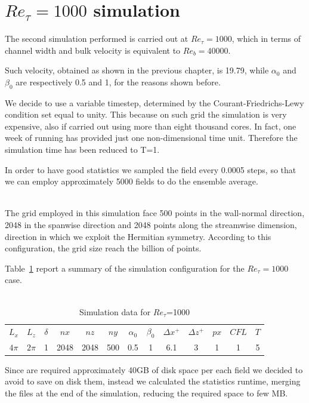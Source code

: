 \section{$Re_{\tau}=1000$ simulation} 
The second simulation performed is carried out at $Re_{\tau}=1000$, which in terms of channel width and bulk velocity is equivalent to $Re_{b}=40000$.\par
Such velocity, obtained as shown in the previous chapter, is 19.79, while $\alpha_{0}$ and $\beta_{0}$ are respectively 0.5 and 1, for the reasons shown before.\par
We decide to use a variable timestep, determined by the Courant-Friedrichs-Lewy condition set equal to unity. This because on such grid the simulation is very expensive, also if carried out using more than eight thousand cores. In fact, one week of running has provided just one non-dimensional time unit. Therefore the simulation time has been reduced to T=1. \par
In order to have good statistics we sampled the field every 0.0005 steps, so that we can employ approximately 5000 fields to do the ensemble average.\\~\par
The grid employed in this simulation face 500 points in the wall-normal direction, 2048 in the spanwise direction and 2048 points along the streamwise dimension, direction in which we exploit the Hermitian symmetry. According to this configuration, the grid size reach the billion of points.\par
Table~\ref{table:1000} report a summary of the simulation configuration for the $Re_{\tau}=1000$ case.\\~\par

\begin{table}
\caption{Simulation data for $Re_{\tau}$=1000}
\begin{center}
\begin{tabular}{ccccccccccccc}
\toprule
$L_{x}$ & $L_{z}$ & $\delta$ & $nx$ & $nz$ & $ny$ & $\alpha_{0}$ & $\beta_{0}$ & $\Delta x^{+}$ & $\Delta z^{+}$ & $px$ & $CFL$ & $T$\\
$4\pi$ & $2\pi$ & 1 & 2048 & 2048 & 500 & 0.5 & 1 & 6.1  & 3 & 1 & 1 & 5 \\
\bottomrule
\end{tabular}
\end{center}
\label{table:1000}
\end{table}


Since are required approximately 40GB of disk space per each field we decided to avoid to save on disk them, instead we calculated the statistics runtime, merging the files at the end of the simulation, reducing the required space to few MB.\\~\par

